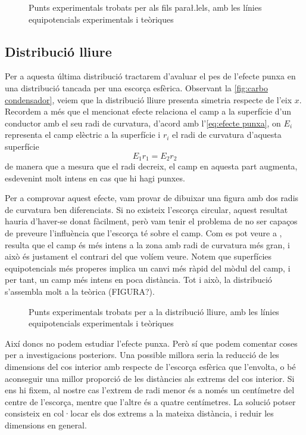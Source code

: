 \begin{figure}[htb]
  \centering \small \sffamily
	
  \caption{Punts experimentals trobats per als fils para\l.lels, amb les línies equipotencials experimentals i teòriques}
  \label{fig:camp fils}
\end{figure}

\subsection{Distribució lliure}
Per a aquesta última distribució tractarem d'avaluar el pes de l'efecte punxa en una distribució tancada per una escorça esfèrica. Observant la \cref{fig:carbo condensador}, veiem que la distribució lliure presenta simetria respecte de l'eix $x$. Recordem a més que el mencionat efecte relaciona el camp a la superfície d'un conductor amb el seu radi de curvatura, d'acord amb l'\cref{eq:efecte punxa}, on $E_i$ representa el camp elèctric a la superfície i $r_i$ el radi de curvatura d'aquesta superfície
\begin{equation} \label{eq:efecte punxa}
	E_1r_1=E_2r_2
\end{equation}
de manera que a mesura que el radi decreix, el camp en aquesta part augmenta, esdevenint molt intens en cas que hi hagi punxes.

Per a comprovar aquest efecte, vam provar de dibuixar una figura amb dos radis de curvatura ben diferenciats. Si no existeix l'escorça circular, aquest resultat hauria d'haver-se donat fàcilment, però vam tenir el problema de no ser capaços de preveure l'influència que l'escorça té sobre el camp. Com es pot veure a , resulta que el camp és més intens a la zona amb radi de curvatura més gran, i això és justament el contrari del que volíem veure. Notem que superfícies equipotencials més properes implica un canvi més ràpid del mòdul del camp, i per tant, un camp més intens en poca distància. Tot i això, la distribució s'assembla molt a la teòrica (FIGURA?).

\begin{figure}[htb]
  \centering \small \sffamily
	
  \caption{Punts experimentals trobats per a la distribució lliure, amb les línies equipotencials experimentals i teòriques}
  \label{fig:camp lliure}
\end{figure}

Així doncs no podem estudiar l'efecte punxa. Però sí que podem comentar coses per a investigacions posteriors. Una possible millora seria la reducció de les dimensions del cos interior amb respecte de l'escorça esfèrica que l'envolta, o bé aconseguir una millor proporció de les distàncies als extrems del cos interior. Si ens hi fixem, al nostre cas l'extrem de radi menor és a només un centímetre del centre de l'escorça, mentre que l'altre és a quatre centímetres. La solució potser consisteix en col·locar els dos extrems a la mateixa distància, i reduir les dimensions en general.


